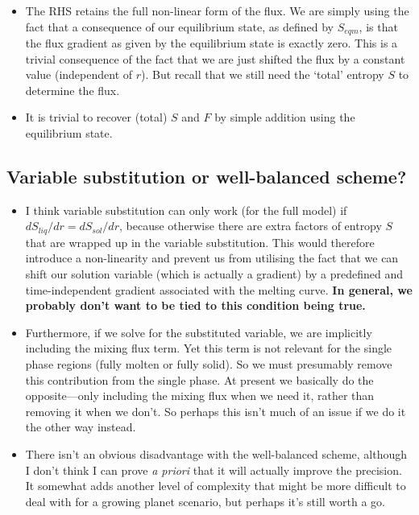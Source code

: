 \begin{itemize}
\begin{itemize}
\item The RHS retains the full non-linear form of the flux.  We are simply using the fact that a consequence of our equilibrium state, as defined by $S_{eqm}$, is that the flux gradient as given by the equilibrium state is exactly zero.  This is a trivial consequence of the fact that we are just shifted the flux by a constant value (independent of $r$).  But recall that we still need the `total' entropy $S$ to determine the flux.
\item It is trivial to recover (total) $S$ and $F$ by simple addition using the equilibrium state.
\end{itemize}
\end{itemize}

\subsection{Variable substitution or well-balanced scheme?}
\begin{itemize}
\item I think variable substitution can only work (for the full model) if $dS_{liq}/dr = dS_{sol}/dr$, because otherwise there are extra factors of entropy $S$ that are wrapped up in the variable substitution.  This would therefore introduce a non-linearity and prevent us from utilising the fact that we can shift our solution variable (which is actually a gradient) by a predefined and time-independent gradient associated with the melting curve.  \textbf{In general, we probably don't want to be tied to this condition being true.}
\item Furthermore, if we solve for the substituted variable, we are implicitly including the mixing flux term.  Yet this term is not relevant for the single phase regions (fully molten or fully solid).  So we must presumably remove this contribution from the single phase.  At present we basically do the opposite---only including the mixing flux when we need it, rather than removing it when we don't.  So perhaps this isn't much of an issue if we do it the other way instead.
\item There isn't an obvious disadvantage with the well-balanced scheme, although I don't think I can prove \emph{a priori} that it will actually improve the precision.  It somewhat adds another level of complexity that might be more difficult to deal with for a growing planet scenario, but perhaps it's still worth a go.

\end{itemize}